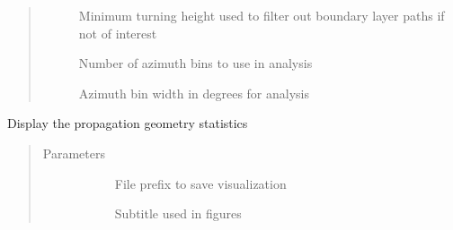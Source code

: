 \documentclass[letterpaper,10pt,english]{sphinxmanual}
\begin{document}
\begin{fulllineitems}
\begin{fulllineitems}
\begin{quote}
\begin{description}
\begin{description}
\item[{}] \leavevmode
Minimum turning height used to filter out boundary layer paths if not of interest

\item[{}] \leavevmode
Number of azimuth bins to use in analysis

\item[{}] \leavevmode
Azimuth bin width in degrees for analysis

\end{description}

\end{description}\end{quote}

\end{fulllineitems}


\begin{fulllineitems}
\label{\detokenize{stochprop.propagation:stochprop.propagation.PathGeometryModel.display}}
Display the propagation geometry statistics
\begin{quote}\begin{description}
\item[{Parameters}] \leavevmode\begin{description}
\item[{}] \leavevmode
File prefix to save visualization

\item[{}] \leavevmode
Subtitle used in figures

\end{description}

\end{description}\end{quote}

\end{fulllineitems}



\end{fulllineitems}
\end{document}
